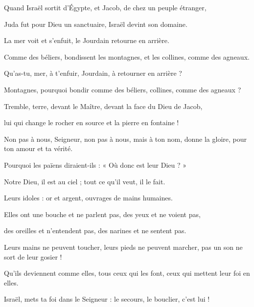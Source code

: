 \item Quand Israël sortit d'Égypte, et Jacob, de chez un peuple étranger,

\item Juda fut pour Dieu un sanctuaire, Israël devint son domaine.

\item La mer voit et s'enfuit, le Jourdain retourne en arrière.

\item Comme des béliers, bondissent les montagnes, et les collines, comme des agneaux.

\item Qu'as-tu, mer, à t'enfuir, Jourdain, à retourner en arrière ?

\item Montagnes, pourquoi bondir comme des béliers, collines, comme des agneaux ?

\item Tremble, terre, devant le Maître, devant la face du Dieu de Jacob,

\item lui qui change le rocher en source et la pierre en fontaine !

\item Non pas à nous, Seigneur, non pas à nous, mais à ton nom, donne la gloire, pour ton amour et ta vérité.

\item Pourquoi les païens diraient-ils : « Où donc est leur Dieu ? »

\item Notre Dieu, il est au ciel ; tout ce qu'il veut, il le fait.

\item Leurs idoles : or et argent, ouvrages de mains humaines.

\item Elles ont une bouche et ne parlent pas, des yeux et ne voient pas,

\item des oreilles et n'entendent pas, des narines et ne sentent pas.

\item Leurs mains ne peuvent toucher, leurs pieds ne peuvent marcher, pas un son ne sort de leur gosier !

\item Qu'ils deviennent comme elles, tous ceux qui les font, ceux qui mettent leur foi en elles.

\item Israël, mets ta foi dans le Seigneur : le secours, le bouclier, c'est lui !


